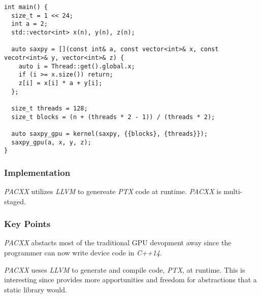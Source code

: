 \begin{lstlisting}[caption={saxpy made with PACXX.}, label={code:saxpyPACXX}]
int main() {
  size_t = 1 << 24;
  int a = 2;
  std::vector<int> x(n), y(n), z(n);

  auto saxpy = [](const int& a, const vector<int>& x, const vecotr<int>& y, vector<int>& z) {
    auto i = Thread::get().global.x;
    if (i >= x.size()) return;
    z[i] = x[i] * a + y[i];
  };

  size_t threads = 128;
  size_t blocks = (n + (threads * 2 - 1)) / (threads * 2);

  auto saxpy_gpu = kernel(saxpy, {{blocks}, {threads}});
  saxpy_gpu(a, x, y, z);
}
\end{lstlisting}

\subsubsection{Implementation}
\textit{PACXX} utilizes \textit{LLVM} to genereate \textit{PTX} code at runtime. \textit{PACXX} is multi-staged.

\subsubsection{Key Points}
\textit{PACXX} abstacts most of the traditional GPU devopment away since the programmer can now write device code in \textit{C++14}.

\textit{PACXX} ueses \textit{LLVM} to generate and compile code, \textit{PTX}, at runtime. This is interesting since provides more apportunities and freedom for abstractions that a static library would.